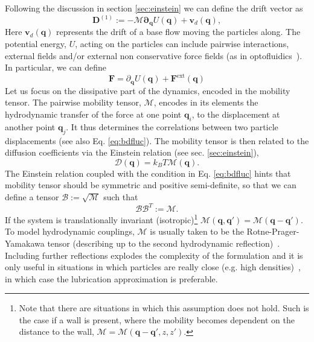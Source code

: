 \documentclass[twoside,openright,titlepage,numbers=noenddot,%
headinclude,footinclude,cleardoublepage=empty,abstract=on,
BCOR=5mm,fontsize=11pt, dvipsnames, paper=b5
]{scrreprt}
\renewcommand{\vec}[1]{\bm{#1}}
\newcommand{\tens}[1]{\bm{\mathcal{#1}}}
\newcommand{\kT}{k_B T}
\newcommand{\ppos}{q}
\begin{document}
Following the discussion in section \ref{sec:einstein} we can define the drift vector as
\begin{equation}
  \label{eq:bddrift}
\vec{D}^{(1)} := -\tens{M}\vec{\partial}_{\vec{\ppos}}U(\vec{\ppos}) + \vec{v}_d(\vec{\ppos}),
\end{equation}
Here  $\vec{v}_d(\vec{\ppos})$ represents the drift of a base flow moving the particles along. The potential energy, $U$, acting on the particles can include pairwise interactions, external fields and/or external non conservative force fields (as in optofluidics~\cite{Melendez2019}). In particular, we can define
\begin{equation}
  \vec{F} = \partial_{\vec{q}}U(\vec{q}) + \vec{F}^{\text{ext}}(\vec{q})
\end{equation}
Let us focus on the dissipative part of the dynamics, encoded in the mobility tensor. The pairwise mobility tensor, $\tens{M}$, encodes in its elements the hydrodynamic transfer of the force at one point $\vec{q}_i$, to the displacement at another point $\vec{q}_j$. It thus determines the correlations between two particle displacements (see also Eq. \eqref{eq:bdfluc}).
The mobility tensor is then related to the diffusion coefficients via the Einstein relation (see sec. \ref{sec:einstein}),
\begin{equation}
  \label{eq:bdeinstein}
  \tens{D}(\vec{\ppos}) = \kT \tens{M}(\vec{\ppos}).
\end{equation}
The Einstein relation coupled with the condition in Eq. \eqref{eq:bdfluc} hints that mobility tensor should be symmetric and positive semi-definite, so that we can define a tensor $\tens{B}:=\sqrt{\tens{M}}$ such that
\begin{equation}
  \tens{B}\tens{B}^T := \tens{M}.
\end{equation}
If the system is translationally invariant (isotropic)\footnote{Note that there are situations in which this assumption does not hold. Such is the case if a wall is present, where the mobility becomes dependent on the distance to the wall, $\tens{M}=\tens{M}(\vec{q}-\vec{q}', z, z')$.} $\tens{M}(\vec{\ppos}, \vec{\ppos}') = \tens{M}(\vec{\ppos}-\vec{\ppos}')$. To model hydrodynamic couplings, $\tens{M}$ is usually taken to be the Rotne-Prager-Yamakawa tensor (describing up to the second hydrodynamic reflection)~\cite{Dhont1996}. Including further reflections explodes the complexity of the formulation and it is only useful in situations in which particles are really close (e.g. high densities)~\cite{Dhont1996}, in which case the lubrication approximation is preferable.
\end{document}
